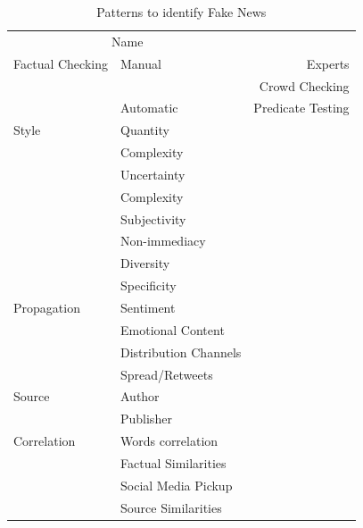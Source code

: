 \documentclass[10pt, a4paper, twocolumn]{article} %
\begin{document}
\begin{table}
	\caption{Patterns to identify Fake News}
	\centering
	\begin{tabular}{llr}
		\toprule
		\multicolumn{2}{c}{Name} \\
		\cmidrule(r){1-2}
		Factual Checking       & Manual    & Experts  \\
		                       &           & Crowd Checking \\
		                       & Automatic & Predicate Testing \\
                Style                  & Quantity  & \\
                                       & Complexity & \\
                                       & Uncertainty & \\
                                       & Complexity & \\
                                       & Subjectivity & \\
                                       & Non-immediacy & \\
                                       & Diversity & \\
                                       & Specificity & \\
                Propagation            & Sentiment & \\
                                       & Emotional Content & \\
                                       & Distribution Channels & \\
                                       & Spread/Retweets & \\
                Source                 & Author & \\
                                       & Publisher & \\
                Correlation            & Words correlation & \\
                                       & Factual Similarities & \\
                                       & Social Media Pickup & \\
                                       & Source Similarities & \\
		\bottomrule
	\end{tabular}
\end{table}
\end{document}
